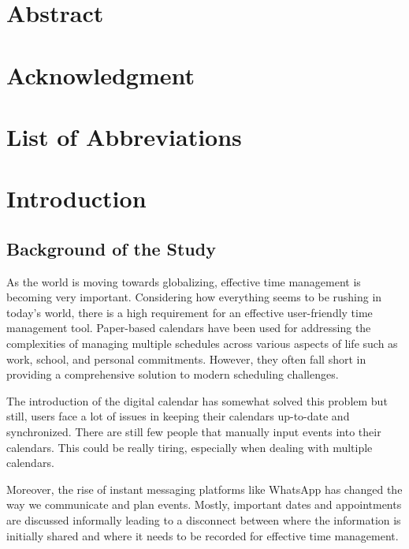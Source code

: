 \documentclass[12pt,a4paper]{report}
\begin{document}
\chapter*{Abstract}

\chapter*{Acknowledgment}
\newpage

\tableofcontents

\newpage
\listoffigures

\newpage
\listoftables
\newpage

\chapter*{List of Abbreviations}


\chapter{Introduction}


\section{Background of the Study}

As the world is moving towards globalizing, effective time management is becoming very important. Considering how everything seems to be rushing in today's world, there is a high requirement for an effective user-friendly time management tool. Paper-based calendars have been used for addressing the complexities of managing multiple schedules across various aspects of life such as work, school, and personal commitments. However, they often fall short in providing a comprehensive solution to modern scheduling challenges.

The introduction of the digital calendar has somewhat solved this problem but still, users face a lot of issues in keeping their calendars up-to-date and synchronized. There are still few people that manually input events into their calendars. This could be really tiring, especially when dealing with multiple calendars.

Moreover, the rise of instant messaging platforms like WhatsApp has changed the way we communicate and plan events. Mostly, important dates and appointments are discussed informally leading to a disconnect between where the information is initially shared and where it needs to be recorded for effective time management.
\end{document}

